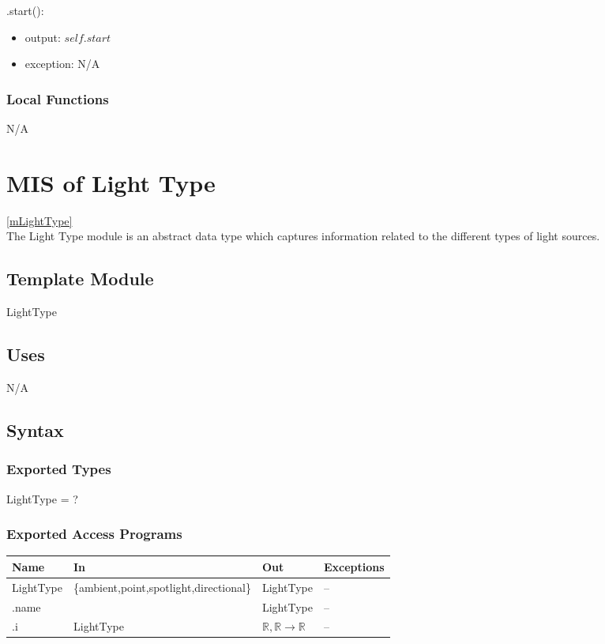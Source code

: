 \documentclass[12pt, titlepage]{article}
\begin{document}
\noindent .start():
\begin{itemize}
	\item output: $self.start$
	\item exception: N/A
\end{itemize}


\subsubsection{Local Functions}
N/A

\newpage

\section{MIS of Light Type} \ref{mLightType} \\
The Light Type module is an abstract data type which captures information 
related to the different types of light sources.

\subsection{Template Module}
LightType

\subsection{Uses}
N/A

\subsection{Syntax}
\subsubsection{Exported Types}
LightType = ?
\subsubsection{Exported Access Programs}
\begin{center}
	\begin{tabular}{p{2cm} p{4cm} p{2cm} p{4cm}}
		\hline
		\textbf{Name} & \textbf{In} & \textbf{Out} & \textbf{Exceptions} \\
		\hline
		LightType & \{ambient,point,spotlight,directional\} & LightType & -- \\
		.name & & LightType & -- \\
		.i & LightType & $\mathbb{R},\mathbb{R} \to 
		\mathbb{R}$ & -- \\
		\hline
	\end{tabular}
\end{center}
\end{document}

